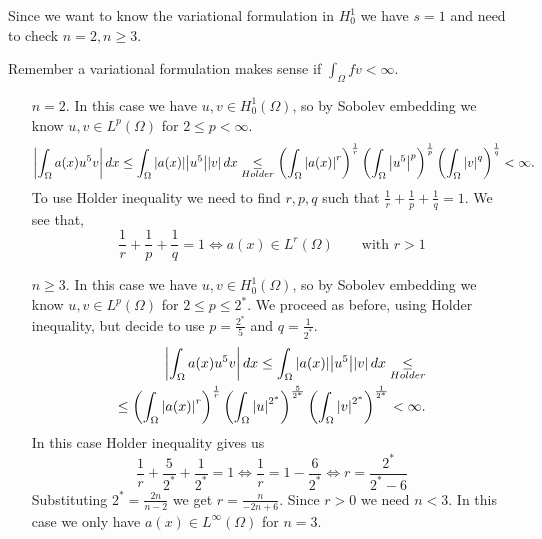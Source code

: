     Since we want to know the variational formulation in \(H^1_0\) we have \(s = 1\) and need to check \(n = 2, n \geq 3\). 
    
    Remember a variational formulation makes sense if \(\int_\Omega fv < \infty\).
    \begin{itemize}
        \item[\(n = 2\).] In this case we have \(u, v \in H^1_0(\Omega)\), so by Sobolev embedding we know \(u, v \in L^p(\Omega)\) for \(2 \leq p < \infty\). 
        \[
            \abs{\int_\Omega a(x) u^5 v}  \, dx \leq \int_\Omega \abs{a(x)} \abs{u^5} \abs{v} \, dx \underset{Holder}{\leq} \left(\int_\Omega \abs{a(x)}^r\right)^{\frac{1}{r}} \left(\int_\Omega \abs{u^5}^p \right)^{\frac{1}{p}} \left(\int_\Omega \abs{v}^q \right)^{\frac{1}{q}} < \infty.
        \]
        To use Holder inequality we need to find \(r, p, q\) such that \(\frac{1}{r} + \frac{1}{p} + \frac{1}{q} = 1\). We see that, 
        \[
            \frac{1}{r} + \frac{1}{p} + \frac{1}{q} = 1 \iff a(x) \in L^r(\Omega) \qquad \text{with } r > 1
        \]
        \item[\(n \geq 3\).] In this case we have \(u, v \in H^1_0(\Omega)\), so by Sobolev embedding we know \(u, v \in L^p(\Omega)\) for \(2 \leq p \leq 2^*\).
        We proceed as before, using Holder inequality, but decide to use \(p = \frac{2^*}{5}\) and \(q = \frac{1}{2^*}.\)
        \[
            \begin{split}
                \abs{\int_\Omega a(x) u^5 v}  \, dx \leq \int_\Omega \abs{a(x)} \abs{u^5} \abs{v} \, dx \underset{{Holder}}{\leq} \\
                \leq \left(\int_\Omega \abs{a(x)}^r\right)^{\frac{1}{r}} \left(\int_\Omega \abs{u}^{2^*} \right)^{\frac{5}{2^*}} \left(\int_\Omega \abs{v}^{2^*} \right)^{\frac{1}{2^*}} < \infty.
            \end{split}
        \]
        In this case Holder inequality gives us 
        \[
            \frac{1}{r} + \frac{5}{2^*} + \frac{1}{2^*} = 1 \iff \frac{1}{r} = 1 - \frac{6}{2^*} \iff r = \frac{2^*}{2^*-6}
        \]
        Substituting \(2^* = \frac{2n}{n - 2}\) we get \(r = \frac{n}{-2n + 6}\). Since \(r > 0\) we need \(n < 3\).
        In this case we only have \(a(x) \in L^\infty(\Omega)\) for \(n = 3\).
    \end{itemize}
    \newpage
    
